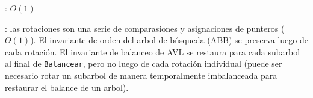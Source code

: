 \begin{Algoritmos}
	\complejidad: $O(1)$

	\justifcomp: las rotaciones son una serie de comparasiones y asignaciones de punteros ($\Theta(1)$). El invariante de orden del arbol de búsqueda (ABB) se preserva luego de cada rotación. El invariante de balanceo de AVL se restaura para cada subarbol al final de \texttt{Balancear}, pero no luego de cada rotación individual (puede ser necesario rotar un subarbol de manera temporalmente imbalanceada para restaurar el balance de un arbol).

\end{Algoritmos}